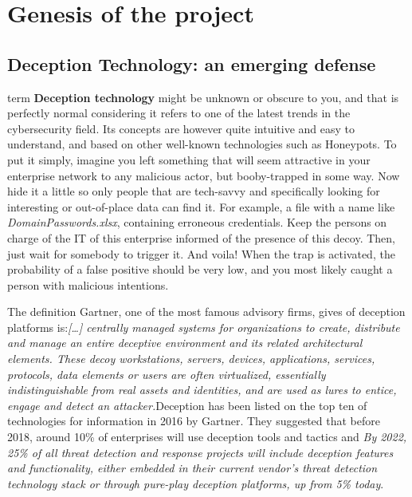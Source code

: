 \documentclass{tnreport}
\begin{document}
\section{Genesis of the project}
\subsection{Deception Technology: an emerging defense}
 term \textbf{Deception technology} might be unknown or obscure to you, and that is perfectly normal considering it refers to one of the latest trends in the cybersecurity field. Its concepts are however quite intuitive and easy to understand, and based on other well-known technologies such as Honeypots.
To put it simply, imagine you left something that will seem attractive in your enterprise network to any malicious actor, but booby-trapped in some way. Now hide it a little so only people that are tech-savvy and specifically looking for interesting or out-of-place data can find it. For example, a file with a name like \textit{DomainPasswords.xlsx}, containing erroneous credentials. Keep the persons on charge of the IT of this enterprise informed of the presence of this decoy. Then, just wait for somebody to trigger it. And voila! When the trap is activated, the probability of a false positive should be very low, and you most likely caught a person with malicious intentions.

The definition Gartner\cite{lib24}, one of the most famous advisory firms, gives of deception platforms is:\textit{[\ldots] centrally managed systems for organizations to create, distribute and manage an entire deceptive environment and its related architectural elements. These decoy workstations, servers, devices, applications, services, protocols, data elements or users are often virtualized, essentially indistinguishable from real assets and identities, and are used as lures to entice, engage and detect an attacker.}\eol Deception has been listed on the top ten of technologies for information in 2016 by Gartner\cite{lib17}\cite{lib16}. They suggested that before 2018, around 10\% of enterprises will use deception tools and tactics and \textit{By 2022, 25\% of all threat detection and response projects will include deception features and functionality, either embedded in their current vendor’s threat detection technology stack or through pure-play deception platforms, up from 5\% today}.
\end{document}

